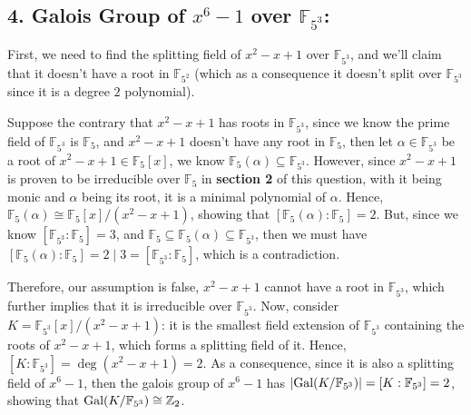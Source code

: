 \documentclass{article}
\newcommand{\FF}{\mathbb{F}}
\newcommand{\ZZ}{\mathbb{Z}}
\newcommand{\Gal}{\textmd{Gal}}
\begin{document}
\subsection*{4. Galois Group of $x^6-1$ over $\FF_{5^3}$:}
First, we need to find the splitting field of $x^2-x+1$ over $\FF_{5^3}$, and we'll claim that it doesn't have a root in $\FF_{5^2}$ (which as a consequence it doesn't split over $\FF_{5^3}$ since it is a degree $2$ polynomial).

Suppose the contrary that $x^2-x+1$ has roots in $\FF_{5^3}$, since we know the prime field of $\FF_{5^3}$ is $\FF_5$, and $x^2-x+1$ doesn't have any root in $\FF_5$, then let $\alpha\in \FF_{5^3}$ be a root of $x^2-x+1\in \FF_5[x]$, we know $\FF_5(\alpha)\subseteq \FF_{5^3}$.
However, since $x^2-x+1$ is proven to be irreducible over $\FF_5$ in \textbf{section 2} of this question, with it being monic and $\alpha$ being its root, it is a minimal polynomial of $\alpha$. Hence, $\FF_5(\alpha)\cong \FF_5[x]/(x^2-x+1)$, showing that $[\FF_5(\alpha):\FF_5]=2$. But, since we know $[\FF_{5^3}:\FF_5]=3$, and $\FF_5\subseteq \FF_5(\alpha)\subseteq \FF_{5^3}$, then we must have $[\FF_5(\alpha):\FF_5]=2\mid 3=[\FF_{5^3}:\FF_5]$, which is a contradiction.

Therefore, our assumption is false, $x^2-x+1$ cannot have a root in $\FF_{5^3}$, which further implies that it is irreducible over $\FF_{5^3}$.
Now, consider $K=\FF_{5^3}[x]/(x^2-x+1)$: it is the smallest field extension of $\FF_{5^3}$ containing the roots of $x^2-x+1$, which forms a splitting field of it. Hence, $[K:\FF_{5^3}] =\deg(x^2-x+1)= 2$. As a consequence, since it is also a splitting field of $x^6-1$, then the galois group of $x^6-1$ has $|\Gal(K/\FF_{5^3})| = [K:\FF_{5^3}] = 2$, showing that $\Gal(K/\FF_{5^3}) \cong \ZZ_2$.
\end{document}

